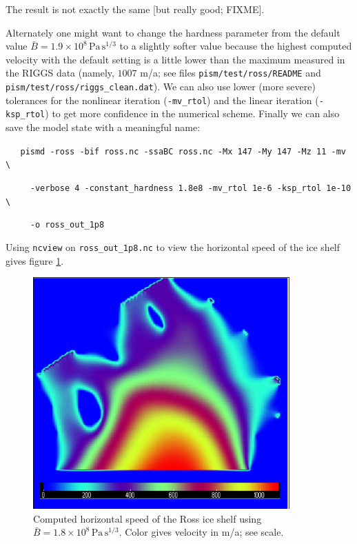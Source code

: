 \documentclass[11pt,final]{amsart}
\begin{document}
The result is not exactly the same [but really good; FIXME].

Alternately one might want to change the hardness parameter from the default value $\bar B = 1.9 \times 10^8 \, \text{Pa}\, \text{s}^{1/3}$ \cite{MacAyealetal} to a slightly softer value because the highest computed velocity with the default setting is a little lower than the maximum measured in the RIGGS data (namely, $1007$ m/a; see files \verb|pism/test/ross/README| and \verb|pism/test/ross/riggs_clean.dat|).   We can also use lower (more severe) tolerances for the nonlinear iteration (\verb|-mv_rtol|) and the linear iteration (\verb|-ksp_rtol|) to get more confidence in the numerical scheme.   Finally we can also save the model state with a meaningful name:

\verb|   pismd -ross -bif ross.nc -ssaBC ross.nc -Mx 147 -My 147 -Mz 11 -mv \|

\verb|     -verbose 4 -constant_hardness 1.8e8 -mv_rtol 1e-6 -ksp_rtol 1e-10 \|

\verb|     -o ross_out_1p8|

\noindent Using \verb|ncview| on \verb|ross_out_1p8.nc| to view the horizontal speed of the ice shelf gives figure \ref{fig:rossspeed1p8}.

\begin{figure}[ht]
\includegraphics[height=3.5in,keepaspectratio=true]{figs/rossspeed1p8}
\caption{Computed horizontal speed of the Ross ice shelf using $\bar B = 1.8 \times 10^8 \, \text{Pa}\, \text{s}^{1/3}$.  Color gives velocity in m/a; see scale.}
\label{fig:rossspeed1p8}
\end{figure}
\end{document}

